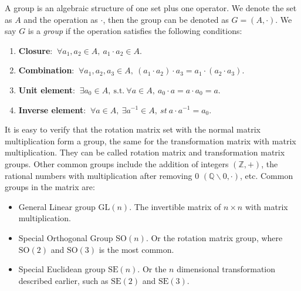 A group is an algebraic structure of one set plus one operator. We denote the set as $A$ and the operation as $\cdot$, then the group can be denoted as $G=(A,\cdot)$. We say $G$ is a \textit{group} if the operation satisfies the following conditions:

\begin{enumerate}
    \item { \textbf{Closure}}: $ \  \forall a_1, a_2 \in A, \  a_1 \cdot a_2 \in A$.
    \item { \textbf{Combination}}: $ \  \forall a_1, a_2, a_3 \in A, \  (a_1 \cdot a_2) \cdot a_3 = a_1 \cdot ( a_2 \cdot a_3) $.
    \item { \textbf{Unit element}}: $ \  \exists a_0 \in A, \  \mathrm{s.t.} \ \forall a \in A, \  a_0 \cdot a = a \cdot a_0 = a $.
    \item { \textbf{Inverse element}}: $ \  \forall a \in A, \  \exists a^{-1} \in A, \  st \  a \cdot a^{-1} = a_0 $.
\end{enumerate}

It is easy to verify that the rotation matrix set with the normal matrix multiplication form a group, the same for the transformation matrix with matrix multiplication. They can be called rotation matrix and transformation matrix groups. Other common groups include the addition of integers $(\mathbb{Z}, +)$, the rational numbers with multiplication after removing 0 $(\mathbb{Q}\backslash 0, \cdot )$, etc. Common groups in the matrix are:

\begin{itemize}
    \item {General Linear group $\mathrm{GL}(n)$}. The invertible matrix of $n \times n$ with matrix multiplication.
    \item {Special Orthogonal Group $\mathrm{SO}(n)$}. Or the rotation matrix group, where $\mathrm{SO}(2)$ and $\mathrm{SO}(3) $ is the most common.
    \item {Special Euclidean group $\mathrm{SE}(n)$}. Or the $n$ dimensional transformation described earlier, such as $\mathrm{SE}(2)$ and $\mathrm{SE}(3)$.
\end{itemize}

